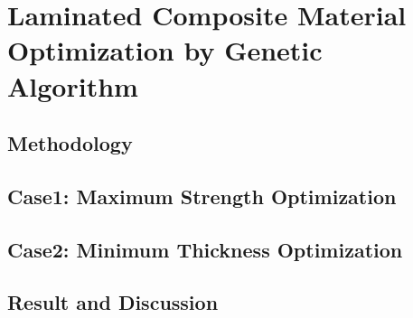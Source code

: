 
\chapter{Laminated Composite Material Optimization by Genetic Algorithm} %

\label{Chapter4} %

\section{Methodology}

\section{Case1: Maximum Strength Optimization}

\section{Case2: Minimum Thickness Optimization}

\section{Result and Discussion}

